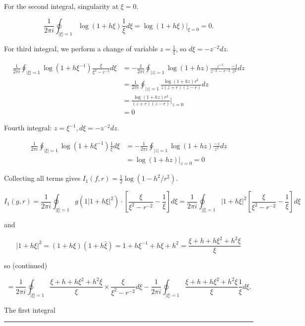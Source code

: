 \documentclass[twoside]{article}
\newenvironment{proof}{{\bf Proof:}}{\hfill\rule{2mm}{2mm}}
\begin{document}
\begin{proof}
	For the second integral, singularity at $\xi=0$.
	
	$$\frac{1}{2\pi i}\oint_{\lvert\xi\rvert =1}\log(1+h\xi)\frac{1}{\xi}d\xi=\log(1+h\xi)\Bigg\lvert_{\xi=0}=0.$$
	
	For third integral, we perform a change of variable $z=\frac{1}{\xi}$, so $d\xi=-z^{-2}dz$.
	
	\begin{equation}
		\begin{split}
			\frac{1}{2\pi i}\oint_{\lvert\xi\rvert =1}\log(1+h\xi^{-1})\frac{\xi}{\xi^2-r^{-2}}d\xi&=-\frac{1}{2\pi i}\oint_{\lvert z\rvert =1}\log(1+hz)\frac{z^{-1}}{z^{-2}-r^{-2}}\frac{-1}{z^{2}}dz\\
			&=\frac{1}{2\pi i }\oint_{\lvert z\rvert =1}\frac{\log(1+hz)r^2}{z(z+r)(z-r)}dz\\
			&=\frac{\log(1+hz)r^2}{(z+r)(z-r)}\Bigg\lvert_{z=0}\\
			&=0
		\end{split}
	\end{equation}
	
	Fourth integral: $z=\xi^{-1}, d\xi =-z^{-2}dz.$
	
	\begin{equation}
		\begin{split}
			\frac{1}{2\pi i}\oint_{\lvert\xi\rvert=1}\log(1+h\xi^{-1})\frac{1}{\xi}d\xi&=-\frac{1}{2\pi i}\oint_{\lvert z\rvert =1}\log(1+hz)\frac{-z}{z^2}dz\\
			&=\log(1+hz)\Bigg\lvert_{z=0}=0
		\end{split}
	\end{equation}
	
	Collecting all terms gives $I_1(f,r)=\frac{1}{2}\log(1-h^2/r^2)$.
	
	$$I_1(g,r)=\frac{1}{2\pi i}\oint_{\lvert\xi\rvert=1}g(1\lvert 1+h\xi\rvert ^2)\cdot\left[\frac{\xi}{\xi^2-r^{-2}}-\frac1\xi\right]d\xi
	=\frac{1}{2\pi i}\oint_{\lvert\xi\rvert =1}\lvert 1+h\xi\rvert ^2\left[\frac{\xi}{\xi^2-r^{-2}}-\frac1\xi\right]d\xi$$
	
	and
	
	$$\lvert 1+h\xi\rvert ^2=(1+h\xi)(1+h\bar{\xi})=1+h\xi^{-1}+h\xi+h^2=\frac{\xi+h+h\xi^2+h^2\xi}{\xi}$$
	
	so (continued)
	
	$$=\frac{1}{2\pi i}\oint_{\lvert\xi\rvert =1}\frac{\xi+h+h\xi^2+h^2\xi}{\xi}\times \frac{\xi}{\xi^2-r^{-2}}d\xi-\frac{1}{2\pi i}\oint_{\lvert\xi\rvert =1}\frac{\xi+h+h\xi^2+h^2\xi}{\xi}\frac{1}{\xi}d\xi.$$
	
	The first integral
	

\end{proof}
\end{document}
